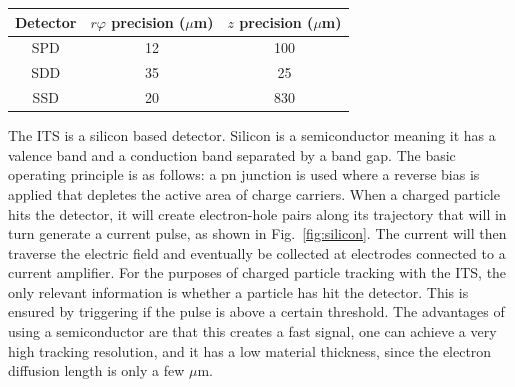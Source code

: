 \begin{table}
\centering
\begin{tabular*}{0.6\columnwidth}{@{\extracolsep{\fill}}ccc@{}}
        \hline
	Detector & $r\varphi$ precision ($\mu$m) & $z$ precision ($\mu$m)\\
	\hline
	SPD & 12 & 100 \\
	SDD & 35 & 25 \\
	SSD & 20 & 830 \\
	\hline
\end{tabular*}
\end{table}


The ITS is a silicon based detector. Silicon is a semiconductor meaning it has a valence band and a conduction band separated by a band gap. The basic operating principle is as follows: a pn junction is used where a reverse bias is applied that depletes the active area of charge carriers. When a charged particle hits the detector, it will create electron-hole pairs along its trajectory that will in turn generate a current pulse, as shown in Fig.~\ref{fig:silicon}. The current will then traverse the electric field and eventually be collected at electrodes connected to a current amplifier. For the purposes of charged particle tracking with the ITS, the only relevant information is whether a particle has hit the detector. This is ensured by triggering if the pulse is above a certain threshold. The advantages of using a semiconductor are that this creates a fast signal, one can achieve a very high tracking resolution, and it has a low material thickness, since the electron diffusion length is only a few $\mu$m.

